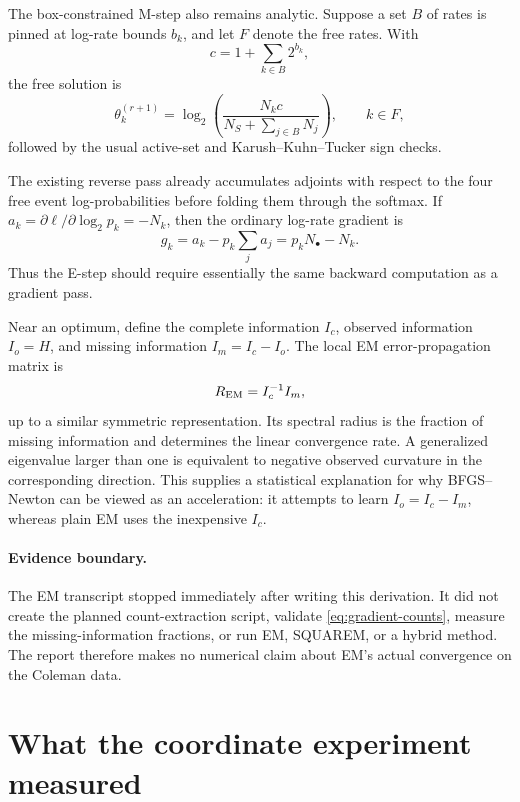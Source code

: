\documentclass[11pt]{article}
\begin{document}
The box-constrained M-step also remains analytic.  Suppose a set $B$ of rates is pinned at log-rate
bounds $b_k$, and let $F$ denote the free rates.  With
\[
  c=1+\sum_{k\in B}2^{b_k},
\]
the free solution is
\begin{equation}
  \theta_k^{(r+1)}
  =\log_2\left(
       \frac{N_kc}{N_S+\sum_{j\in B}N_j}
    \right),\qquad k\in F,                          \label{eq:box-em}
\end{equation}
followed by the usual active-set and Karush--Kuhn--Tucker sign checks.

The existing reverse pass already accumulates adjoints with respect to the four free event
log-probabilities before folding them through the softmax.  If
$a_k=\partial\ell/\partial\log_2p_k=-N_k$, then the ordinary log-rate gradient is
\begin{equation}
  g_k=a_k-p_k\sum_j a_j=p_kN_\bullet-N_k.             \label{eq:gradient-counts}
\end{equation}
Thus the E-step should require essentially the same backward computation as a gradient pass.

Near an optimum, define the complete information $I_c$, observed information $I_o=H$, and missing
information $I_m=I_c-I_o$.  The local EM error-propagation matrix is
\begin{equation}
  R_{\rm EM}=I_c^{-1}I_m,                             \label{eq:em-rate}
\end{equation}
up to a similar symmetric representation.  Its spectral radius is the fraction of missing
information and determines the linear convergence rate.  A generalized eigenvalue larger than
one is equivalent to negative observed curvature in the corresponding direction.  This supplies
a statistical explanation for why BFGS--Newton can be viewed as an acceleration: it attempts to
learn $I_o=I_c-I_m$, whereas plain EM uses the inexpensive $I_c$.

\paragraph{Evidence boundary.}
The EM transcript stopped immediately after writing this derivation.  It did not create the planned
count-extraction script, validate \eqref{eq:gradient-counts}, measure the missing-information
fractions, or run EM, SQUAREM, or a hybrid method.  The report therefore makes no numerical claim
about EM's actual convergence on the Coleman data.

\section{What the coordinate experiment measured}
\end{document}

